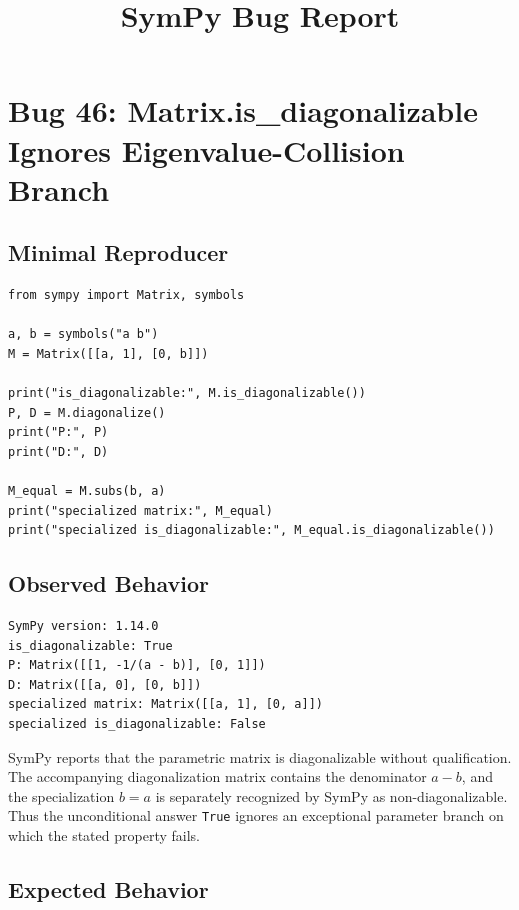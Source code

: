 \documentclass[11pt]{article}
\title{SymPy Bug Report}
\author{}
\date{}
\begin{document}
\maketitle

\section{Bug 46: Matrix.is\_diagonalizable Ignores Eigenvalue-Collision Branch}

\subsection{Minimal Reproducer}

\medskip

\begin{lstlisting}[style=bugpython]
from sympy import Matrix, symbols

a, b = symbols("a b")
M = Matrix([[a, 1], [0, b]])

print("is_diagonalizable:", M.is_diagonalizable())
P, D = M.diagonalize()
print("P:", P)
print("D:", D)

M_equal = M.subs(b, a)
print("specialized matrix:", M_equal)
print("specialized is_diagonalizable:", M_equal.is_diagonalizable())
\end{lstlisting}

\subsection{Observed Behavior}

\medskip

\begin{lstlisting}[style=bugpython]
SymPy version: 1.14.0
is_diagonalizable: True
P: Matrix([[1, -1/(a - b)], [0, 1]])
D: Matrix([[a, 0], [0, b]])
specialized matrix: Matrix([[a, 1], [0, a]])
specialized is_diagonalizable: False
\end{lstlisting}

SymPy reports that the parametric matrix is diagonalizable without qualification. The accompanying diagonalization matrix contains the denominator \(a-b\), and the specialization \(b=a\) is separately recognized by SymPy as non-diagonalizable. Thus the unconditional answer \texttt{True} ignores an exceptional parameter branch on which the stated property fails.

\subsection{Expected Behavior}
\end{document}
